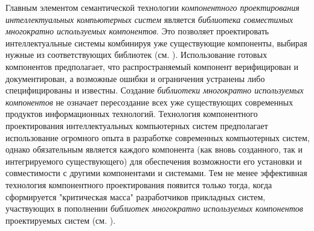 Главным элементом семантической технологии \textit{компонентного проектирования интеллектуальных компьютерных систем} является \textit{библиотека совместимых многократно используемых компонентов}. Это позволяет проектировать интеллектуальные системы комбинируя уже существующие компоненты, выбирая нужные из соответствующих библиотек (см. ). Использование готовых компонентов предполагает, что распространяемый компонент верифицирован и документирован, а возможные ошибки и ограничения устранены либо специфицированы и известны. Создание \textit{библиотеки многократно используемых компонентов} не означает пересоздание всех уже существующих современных продуктов информационных технологий. Технология компонентного проектирования интеллектуальных компьютерных систем предполагает использование огромного опыта в разработке современных компьютерных систем, однако обязательным является  каждого компонента (как вновь созданного, так и интегрируемого существующего) для обеспечения возможности его установки и совместимости с другими компонентами и системами. Тем не менее эффективная технология компонентного проектирования появится только тогда, когда сформируется "критическая масса"{} разработчиков прикладных систем, участвующих в пополнении \textit{библиотек многократно используемых компонентов} проектируемых систем (см. ).

